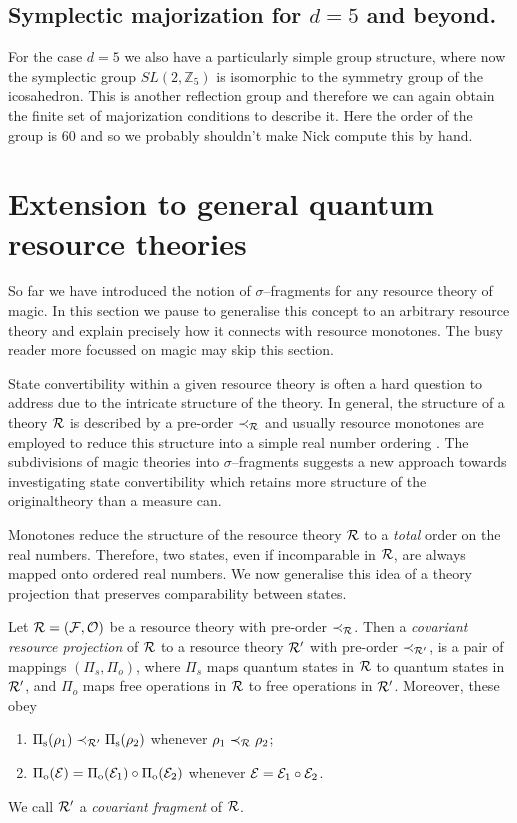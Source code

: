 \documentclass[pra,
aps,
twocolumn,
superscriptaddress,
groupedaddress,
nofootinbib,
reprint
]{revtex4-1}
\begin{document}
\subsection{Symplectic majorization for $d =5$ and beyond.}
For the case $d=5$ we also have a particularly simple group structure, where now the symplectic group $SL(2, \mathbb{Z}_5)$ is isomorphic to the symmetry group of the icosahedron. This is another reflection group and therefore we can again obtain the finite set of majorization conditions to describe it. Here the order of the group is $60$ and so we probably shouldn't make Nick compute this by hand.
\newpage
\section{Extension to general quantum resource theories}
\label{sec:frag}

So far we have introduced the notion of $\sigma$--fragments for any resource theory of magic. 
In this section we pause to generalise this concept to an arbitrary resource theory and explain precisely how it connects with resource monotones. 
The busy reader more focussed on magic may skip this section.

State convertibility within a given resource theory is often a hard question to address due to the intricate structure of the theory.
In general, the structure of a theory $\mathcal{R}$ is described by a pre-order $\prec_{\mathcal{R}}$ and usually resource monotones are employed to reduce this structure into a simple real number ordering .
The subdivisions of magic theories into $\sigma$--fragments suggests a new approach towards investigating state convertibility which retains more structure of the originaltheory than a measure can.

Monotones reduce the structure of the resource theory $\mathcal{R}$ to a \emph{total} order on the real numbers.
Therefore, two states, even if incomparable in $\mathcal{R}$, are always mapped onto ordered real numbers.
We now generalise this idea of a theory projection that preserves comparability between states. 
\begin{definition}\label{def:covproj}
Let $\mathcal{R} = (\mathcal{F}, \mathcal{O})$ be a resource theory with pre-order $\prec_{\mathcal{R}}$. 
Then a \emph{covariant resource projection} of $\mathcal{R}$ to a resource theory $\mathcal{R}'$ with pre-order $\prec_{\mathcal{R}'}$, is a pair of mappings $(\Pi_s, \Pi_o)$, where $\Pi_s$ maps quantum states in $\mathcal{R}$ to quantum states in $\mathcal{R}'$, and $\Pi_o$ maps free operations in $\mathcal{R}$ to free operations in $\mathcal{R}'$. 
Moreover, these obey
	\begin{enumerate}
        \item $\Pi_{\rm{s}}(\rho_1) \prec_{\mathcal{R}'} \Pi_{\rm{s}}(\rho_2)$ whenever $\rho_1 \prec_{\mathcal{R}} \rho_2$;
        \item $\Pi_{\rm{o}}(\mathcal{E}) = \Pi_{\rm{o}}(\mathcal{E}_1) \circ \Pi_{\rm{o}}(\mathcal{E}_2)$ whenever $\mathcal{E} = \mathcal{E}_1 \circ \mathcal{E}_2$.
    \end{enumerate}
We call $\mathcal{R}'$ a \emph{covariant fragment} of $\mathcal{R}$.
\end{definition}
\end{document}

